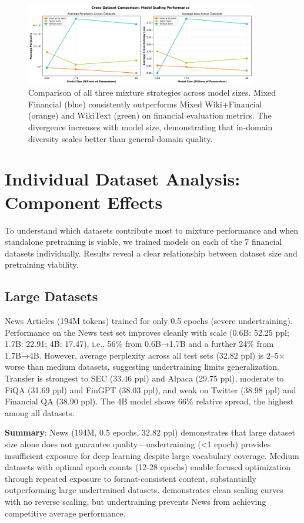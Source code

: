 \begin{figure}[htbp]
\centering
\includegraphics[width=0.9\textwidth]{figures/scaling_comparison_all.png}
\caption[Comparison of Mixture Strategies]{Comparison of all three mixture strategies across model sizes. Mixed Financial (blue) consistently outperforms Mixed Wiki+Financial (orange) and WikiText (green) on financial evaluation metrics. The divergence increases with model size, demonstrating that in-domain diversity scales better than general-domain quality.}
\label{fig:scaling_comparison_all}
\end{figure}

\section{Individual Dataset Analysis: Component Effects}

To understand which datasets contribute most to mixture performance and when standalone pretraining is viable, we trained models on each of the 7 financial datasets individually. Results reveal a clear relationship between dataset size and pretraining viability.

\subsection{Large Datasets}

News Articles (194M tokens) trained for only 0.5 epochs (severe undertraining). Performance on the News test set improves cleanly with scale (0.6B: 52.25 ppl; 1.7B: 22.91; 4B: 17.47), i.e., 56\% from 0.6B→1.7B and a further 24\% from 1.7B→4B. However, average perplexity across all test sets (32.82 ppl) is 2–5$\times$ worse than medium datasets, suggesting undertraining limits generalization. Transfer is strongest to SEC (33.46 ppl) and Alpaca (29.75 ppl), moderate to FiQA (31.69 ppl) and FinGPT (38.03 ppl), and weak on Twitter (38.98 ppl) and Financial QA (38.90 ppl). The 4B model shows 66\% relative spread, the highest among all datasets.

\textbf{Summary}: News (194M, 0.5 epochs, 32.82 ppl) demonstrates that large dataset size alone does not guarantee quality—undertraining (<1 epoch) provides insufficient exposure for deep learning despite large vocabulary coverage. Medium datasets with optimal epoch counts (12-28 epochs) enable focused optimization through repeated exposure to format-consistent content, substantially outperforming large undertrained datasets.  demonstrates clean scaling curves with no reverse scaling, but undertraining prevents News from achieving competitive average performance.

